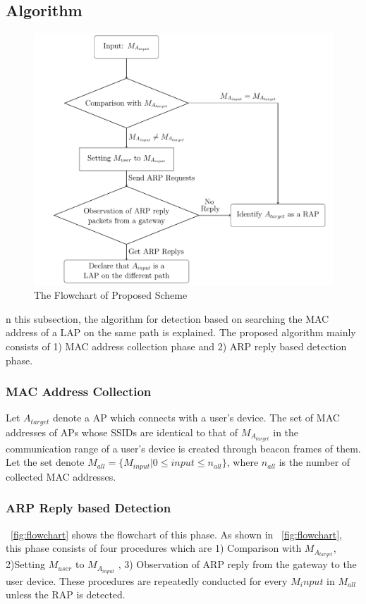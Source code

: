 \documentclass[conference]{IEEEtran}
\newcommand{\tarMAC}{M_{A_{target}}}
\newcommand{\userMAC}{M_{user}}
\newcommand{\tarAP}{A_{target}}
\begin{document}
\subsection{Algorithm}
\begin{figure}[t]
    \begin{center}
        \includegraphics[scale=0.4]{image/flowchart.pdf}
        \caption{The Flowchart of Proposed Scheme}
        \label{flowchart}
    \end{center}
\end{figure}
n this subsection, the algorithm for detection based on searching the MAC address of a LAP on the same path is explained.
The proposed algorithm mainly consists of 1) MAC address collection phase and 2) ARP reply based detection phase. 

\subsubsection{MAC Address Collection}
Let $\tarAP$ denote a AP which connects with a user's device.
The set of MAC addresses of APs whose SSIDs are identical to that of $\tarMAC$  in the communication range of a user's device is created through beacon frames of them. 
Let the set denote $M_{all}=\{M_{input}|0\le input \le n_{all}  \}$, where $n_{all}$ is the number of collected MAC addresses.

\subsubsection{ARP Reply based Detection}
\figurename~\ref{fig:flowchart} shows the flowchart of this phase.
As shown in \figurename~\ref{fig:flowchart}, this phase consists of four procedures which are 1) Comparison with $\tarMAC$, 2)Setting $\userMAC$ to \newcommand{\inputMAC}{M_{A_{input}}}$\inputMAC$ , 3) Observation of ARP reply from the gateway to the user device.
These procedures are repeatedly conducted for every $M_input$ in $M_{all}$ unless the RAP is detected.
\end{document}
